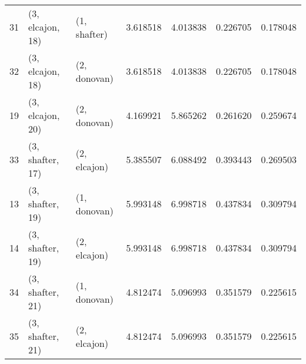 \begin{tabular}{lllrrrr}
31 &  (3, elcajon, 18) &     (1, shafter) &  3.618518 &  4.013838 &   0.226705 &  0.178048 \\
32 &  (3, elcajon, 18) &     (2, donovan) &  3.618518 &  4.013838 &   0.226705 &  0.178048 \\
19 &  (3, elcajon, 20) &     (2, donovan) &  4.169921 &  5.865262 &   0.261620 &  0.259674 \\
33 &  (3, shafter, 17) &     (2, elcajon) &  5.385507 &  6.088492 &   0.393443 &  0.269503 \\
13 &  (3, shafter, 19) &     (1, donovan) &  5.993148 &  6.998718 &   0.437834 &  0.309794 \\
14 &  (3, shafter, 19) &     (2, elcajon) &  5.993148 &  6.998718 &   0.437834 &  0.309794 \\
34 &  (3, shafter, 21) &     (1, donovan) &  4.812474 &  5.096993 &   0.351579 &  0.225615 \\
35 &  (3, shafter, 21) &     (2, elcajon) &  4.812474 &  5.096993 &   0.351579 &  0.225615 \\
\bottomrule
\end{tabular}
